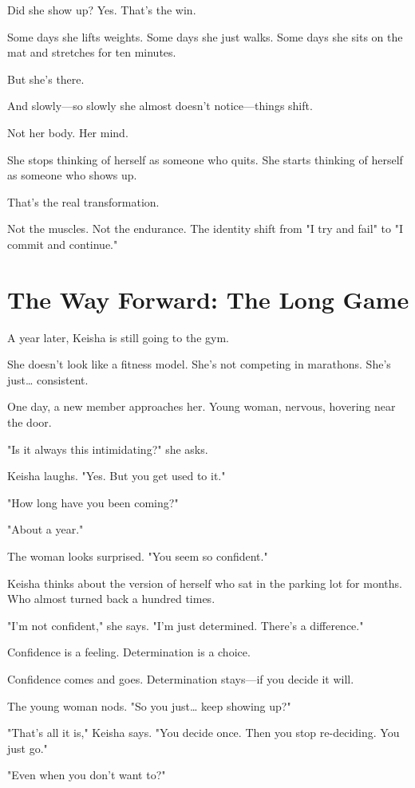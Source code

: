 \documentclass[11pt,twoside]{book}
\begin{document}
Did she show up? Yes. That's the win.

Some days she lifts weights. Some days she just walks. Some days she sits on the mat and stretches for ten minutes.

But she's there.

And slowly—so slowly she almost doesn't notice—things shift.

Not her body. Her mind.

She stops thinking of herself as someone who quits. She starts thinking of herself as someone who shows up.

That's the real transformation.

Not the muscles. Not the endurance. The identity shift from "I try and fail" to "I commit and continue."

\section*{The Way Forward: The Long Game}

A year later, Keisha is still going to the gym.

She doesn't look like a fitness model. She's not competing in marathons. She's just\ldots{} consistent.

One day, a new member approaches her. Young woman, nervous, hovering near the door.

"Is it always this intimidating?" she asks.

Keisha laughs. "Yes. But you get used to it."

"How long have you been coming?"

"About a year."

The woman looks surprised. "You seem so confident."

Keisha thinks about the version of herself who sat in the parking lot for months. Who almost turned back a hundred times.

"I'm not confident," she says. "I'm just determined. There's a difference."

Confidence is a feeling. Determination is a choice.

Confidence comes and goes. Determination stays—if you decide it will.

The young woman nods. "So you just\ldots{} keep showing up?"

"That's all it is," Keisha says. "You decide once. Then you stop re-deciding. You just go."

"Even when you don't want to?"
\end{document}
